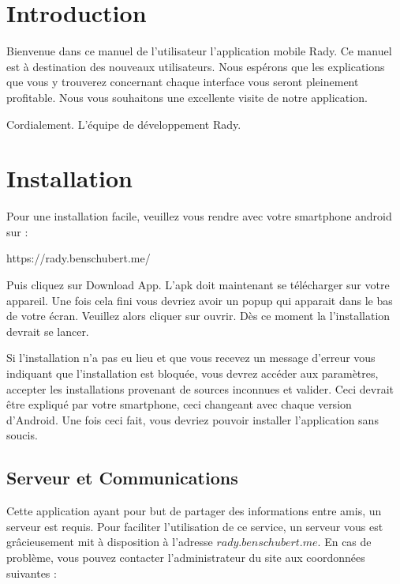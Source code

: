 \documentclass[french]{article}
\begin{document}
	\newpage	
	\section{Introduction}
	Bienvenue dans ce manuel de l’utilisateur l'application mobile Rady. Ce manuel est à destination des nouveaux utilisateurs. Nous espérons que les explications que vous y trouverez concernant chaque interface vous seront pleinement profitable. Nous vous souhaitons une excellente visite de notre application.  
	
	\bigskip
	\bigskip
	
	Cordialement.
	\newline
	L'équipe de développement Rady.
		
	\section{Installation}
	
	Pour une installation facile, veuillez vous rendre avec votre smartphone android sur :
	\bigskip
	
	\centering
	https://rady.benschubert.me/
	
	\bigskip
	\justifying 
	Puis cliquez sur Download App. L'apk doit maintenant se télécharger sur votre appareil. Une fois cela fini vous devriez avoir un popup qui apparait dans le bas de votre écran. Veuillez alors cliquer sur ouvrir.
	Dès ce moment la l'installation devrait se lancer.
	\newline
	\newline
	
	Si l'installation n'a pas eu lieu et que vous recevez un message d'erreur vous indiquant que l'installation est bloquée, vous devrez accéder aux paramètres, accepter les installations provenant de sources inconnues et valider. Ceci devrait être expliqué par votre smartphone, ceci changeant avec chaque version d'Android. Une fois ceci fait, vous devriez pouvoir installer l'application sans soucis.
	
	\subsection{Serveur et Communications}
	
	Cette application ayant pour but de partager des informations entre amis, un serveur est requis. Pour faciliter l'utilisation de ce service, un serveur vous est grâcieusement mit à disposition à l'adresse $rady.benschubert.me$. En cas de problème, vous pouvez contacter l'administrateur du site aux coordonnées suivantes : \\
	
\end{document}
